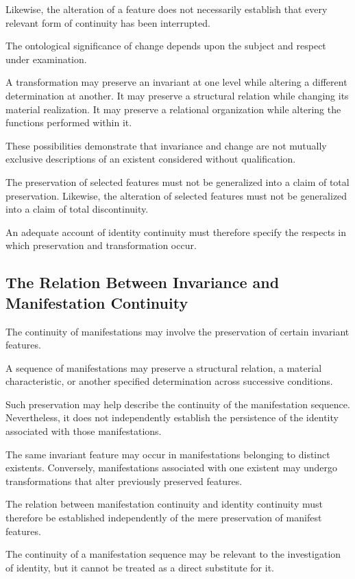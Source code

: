 Likewise, the alteration of a feature does not
necessarily establish that every relevant form of
continuity has been interrupted.

The ontological significance of change depends upon
the subject and respect under examination.

A transformation may preserve an invariant at one
level while altering a different determination at
another. It may preserve a structural relation while
changing its material realization. It may preserve
a relational organization while altering the functions
performed within it.

These possibilities demonstrate that invariance and
change are not mutually exclusive descriptions
of an existent considered without qualification.

The preservation of selected features must not be
generalized into a claim of total preservation.
Likewise, the alteration of selected features must
not be generalized into a claim of total discontinuity.

An adequate account of identity continuity must
therefore specify the respects in which preservation
and transformation occur.

\subsection{The Relation Between Invariance and Manifestation Continuity}

The continuity of manifestations may involve the
preservation of certain invariant features.

A sequence of manifestations may preserve a structural
relation, a material characteristic, or another
specified determination across successive conditions.

Such preservation may help describe the continuity
of the manifestation sequence. Nevertheless, it
does not independently establish the persistence
of the identity associated with those manifestations.

The same invariant feature may occur in manifestations
belonging to distinct existents. Conversely, manifestations
associated with one existent may undergo transformations
that alter previously preserved features.

The relation between manifestation continuity and
identity continuity must therefore be established
independently of the mere preservation of manifest
features.

The continuity of a manifestation sequence may be
relevant to the investigation of identity, but it
cannot be treated as a direct substitute for it.

